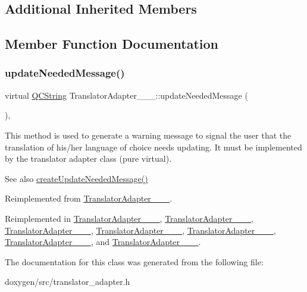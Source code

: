 \subsection*{Additional Inherited Members}


\subsection{Member Function Documentation}
\mbox{\label{class_translator_adapter__1__8__4_a87dbcf9a99bf2ddfd9593461d331b714}} 
\subsubsection{\texorpdfstring{updateNeededMessage()}{updateNeededMessage()}}
{\footnotesize\ttfamily virtual \mbox{\hyperlink{class_q_c_string}{Q\+C\+String}} Translator\+Adapter\+\_\+\_\+\_\+::update\+Needed\+Message (\begin{DoxyParamCaption}{ }\end{DoxyParamCaption})\hspace{0.3cm}{\ttfamily [inline]}, {\ttfamily [virtual]}}

This method is used to generate a warning message to signal the user that the translation of his/her language of choice needs updating. It must be implemented by the translator adapter class (pure virtual).

\begin{DoxySeeAlso}{See also}
\mbox{\hyperlink{class_translator_adapter_base_a71493b87a34d6e4c232e540734aba698}{create\+Update\+Needed\+Message()}} 
\end{DoxySeeAlso}


Reimplemented from \mbox{\hyperlink{class_translator_adapter__1__8__15_a80d2ab2af345124fee8267ad82ac51ed}{Translator\+Adapter\+\_\+\_\+\_}}.



Reimplemented in \mbox{\hyperlink{class_translator_adapter__1__4__6_ab19b01d4e00c95ef1e6eb631fbe6ada4}{Translator\+Adapter\+\_\+\_\+\_}}, \mbox{\hyperlink{class_translator_adapter__1__5__4_a587a31dad925e47f206b6a0cda9eedd0}{Translator\+Adapter\+\_\+\_\+\_}}, \mbox{\hyperlink{class_translator_adapter__1__6__0_abc231eb2c1864ca9f878e7e5deb94f54}{Translator\+Adapter\+\_\+\_\+\_}}, \mbox{\hyperlink{class_translator_adapter__1__6__3_ab3d79abfb926c41bd7609eeb706654fe}{Translator\+Adapter\+\_\+\_\+\_}}, \mbox{\hyperlink{class_translator_adapter__1__7__5_a6e69d48e79a13c9d934f9af1a8befd8a}{Translator\+Adapter\+\_\+\_\+\_}}, \mbox{\hyperlink{class_translator_adapter__1__8__0_a47cedb130d9a178d9c632584d4f2abec}{Translator\+Adapter\+\_\+\_\+\_}}, and \mbox{\hyperlink{class_translator_adapter__1__8__2_a307747456f69ab8dcb0c2be27f429e80}{Translator\+Adapter\+\_\+\_\+\_}}.



The documentation for this class was generated from the following file\+:\begin{DoxyCompactItemize}
\item 
doxygen/src/translator\+\_\+adapter.\+h\end{DoxyCompactItemize}
